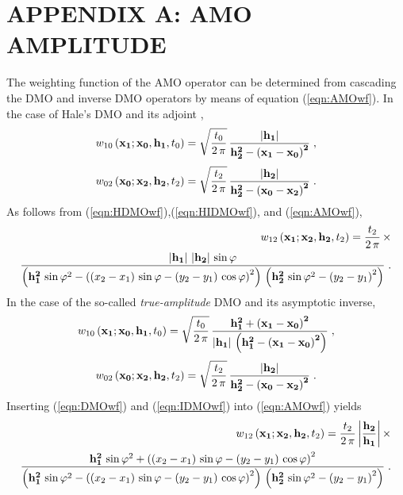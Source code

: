 \section{APPENDIX A: AMO AMPLITUDE}
The weighting function of the AMO operator can be determined from 
cascading the DMO and inverse DMO operators by means of equation
(\ref{eqn:AMOwf}). In the case of Hale's DMO \cite[]{Hale} and
its adjoint \cite[]{GEO52-07-09730984},
\begin{equation}
w_{10}\left({\bf x_1;x_0, h_1},t_0\right) = 
\sqrt{t_0 \over 2\,\pi}\,
{{\bf {\left|h_1\right|} \over {h_2^2-\left(x_1-x_0\right)^2}}}\;,
\label{eqn:HDMOwf}
\end{equation}
\begin{equation}
w_{02}\left({\bf x_0;x_2, h_2},t_2\right)  = 
\sqrt{t_2 \over 2\,\pi}\,
{{\bf {\left|h_2\right|} \over {h_2^2-\left(x_0-x_2\right)^2}}}\;.
\label{eqn:HIDMOwf}
\end{equation}  
As follows from (\ref{eqn:HDMOwf}),(\ref{eqn:HIDMOwf}), and (\ref{eqn:AMOwf}),
\begin{eqnarray}
\nonumber
w_{12}\left({\bf x_1;x_2, h_2},t_2\right) = {t_2 \over {2\,\pi}}\,
\times \\
{{{\bf \left|h_1\right|\,\left|h_2\right|}\,\sin{\varphi}}\over
{\left({\bf h_1^2}\,\sin{\varphi}^2-
\left(\left(x_2-x_1\right)\,\sin{\varphi}-
\left(y_2-y_1\right)\,\cos{\varphi}\right)^2\right)\,
\left({\bf h_2^2}\,\sin{\varphi}^2-\left(y_2-y_1\right)^2\right)}}\;.
\label{eqn:HAMOwfdf}
\end{eqnarray}
In the case of the so-called {\em true-amplitude} DMO
\cite[]{black} and its asymptotic inverse,
\begin{equation}
w_{10}\left({\bf x_1;x_0, h_1},t_0\right)  = 
\sqrt{t_0 \over 2\,\pi}\,
{\bf {h_1^2+\left(x_1-x_0\right)^2} \over
\left|h_1\right|\,\left(h_1^2-\left(x_1-x_0\right)^2\right)}\;,
\label{eqn:DMOwf}
\end{equation}
\begin{equation}
w_{02}\left({\bf x_0;x_2, h_2},t_2\right)  = 
\sqrt{t_2 \over 2\,\pi}\,
{{\bf {\left|h_2\right|} \over {h_2^2-\left(x_0-x_2\right)^2}}}\;.
\label{eqn:IDMOwf}
\end{equation}  
Inserting (\ref{eqn:DMOwf}) and (\ref{eqn:IDMOwf}) into (\ref{eqn:AMOwf}) yields
\begin{eqnarray}
\nonumber
w_{12}\left({\bf x_1;x_2, h_2},t_2\right) = {t_2 \over {2\,\pi}}\,
{\left|{\bf h_2 \over h_1}\right|}\,\times \\
{{{\bf h_1^2}\,\sin{\varphi}^2+
\left(\left(x_2-x_1\right)\,\sin{\varphi}-
\left(y_2-y_1\right)\,\cos{\varphi}\right)^2}\over
{\left({\bf h_1^2}\,\sin{\varphi}^2-
\left(\left(x_2-x_1\right)\,\sin{\varphi}-
\left(y_2-y_1\right)\,\cos{\varphi}\right)^2\right)\,
\left({\bf h_2^2}\,\sin{\varphi}^2-\left(y_2-y_1\right)^2\right)}}\;.
\label{eqn:AMOwfdf}
\end{eqnarray}
\appendix
